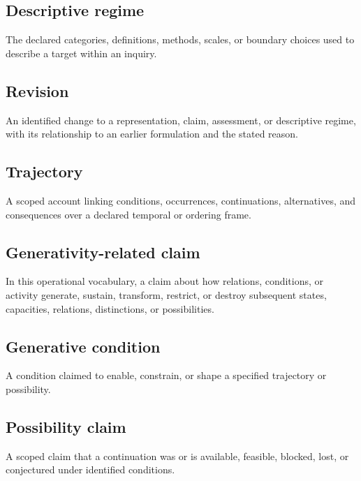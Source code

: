\documentclass[11pt,a4paper]{article}
\begin{document}
\subsection{Descriptive regime}
The declared categories, definitions, methods, scales, or boundary choices used to describe a target within an inquiry.

\subsection{Revision}
An identified change to a representation, claim, assessment, or descriptive regime, with its relationship to an earlier formulation and the stated reason.

\subsection{Trajectory}
A scoped account linking conditions, occurrences, continuations, alternatives, and consequences over a declared temporal or ordering frame.

\subsection{Generativity-related claim}
In this operational vocabulary, a claim about how relations, conditions, or activity generate, sustain, transform, restrict, or destroy subsequent states, capacities, relations, distinctions, or possibilities.

\subsection{Generative condition}
A condition claimed to enable, constrain, or shape a specified trajectory or possibility.

\subsection{Possibility claim}
A scoped claim that a continuation was or is available, feasible, blocked, lost, or conjectured under identified conditions.
\end{document}
